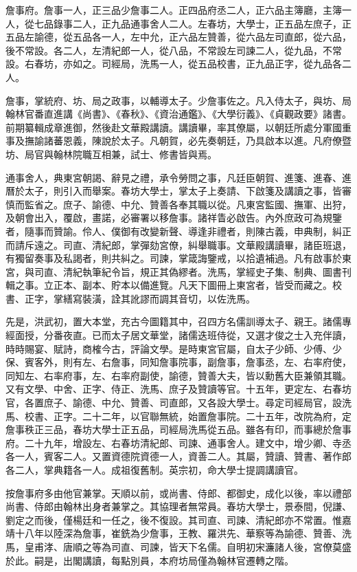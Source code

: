 詹事府。詹事一人，正三品少詹事二人。正四品府丞二人，正六品主簿廳，主簿一人，從七品錄事二人，正九品通事舍人二人。左春坊，大學士，正五品左庶子，正五品左諭德，從五品各一人，左中允，正六品左贊善，從六品左司直郎，從六品，後不常設。各二人，左清紀郎一人，從八品，不常設左司諫二人，從九品，不常設。右春坊，亦如之。司經局，洗馬一人，從五品校書，正九品正字，從九品各二人。

詹事，掌統府、坊、局之政事，以輔導太子。少詹事佐之。凡入侍太子，與坊、局翰林官番直進講《尚書》、《春秋》、《資治通鑑》、《大學衍義》、《貞觀政要》諸書。前期纂輯成章進御，然後赴文華殿講讀。講讀畢，率其僚屬，以朝廷所處分軍國重事及撫諭諸蕃恩義，陳說於太子。凡朝賀，必先奏朝廷，乃具啟本以進。凡府僚暨坊、局官與翰林院職互相兼，試士、修書皆與焉。

通事舍人，典東宮朝謁、辭見之禮，承令勞問之事，凡廷臣朝賀、進箋、進春、進曆於太子，則引入而舉案。春坊大學士，掌太子上奏請、下啟箋及講讀之事，皆審慎而監省之。庶子、諭德、中允、贊善各奉其職以從。凡東宮監國、撫軍、出狩，及朝會出入，覆啟，畫諾，必審署以移詹事。諸祥眚必啟告。內外庶政可為規鑒者，隨事而贊諭。伶人、僕御有改變新聲、導逢非禮者，則陳古義，申典制，糾正而請斥遠之。司直、清紀郎，掌彈劾宮僚，糾舉職事。文華殿講讀畢，諸臣班退，有獨留奏事及私謁者，則共糾之。司諫，掌箴誨鑒戒，以拾遺補過。凡有啟事於東宮，與司直、清紀執筆紀令旨，規正其偽繆者。洗馬，掌經史子集、制典、圖書刊輯之事。立正本、副本、貯本以備進覽。凡天下圖冊上東宮者，皆受而藏之。校書、正字，掌繕寫裝潢，詮其訛謬而調其音切，以佐洗馬。

先是，洪武初，置大本堂，充古今圖籍其中，召四方名儒訓導太子、親王。諸儒專經面授，分番夜直。已而太子居文華堂，諸儒迭班侍從，又選才俊之士入充伴讀，時時賜宴、賦詩，商榷今古，評論文學。是時東宮官屬，自太子少師、少傅、少保、賓客外，則有左、右詹事，同知詹事院事，副詹事，詹事丞，左、右率府使，同知左、右率府事，左、右率府副使，諭德，贊善大夫，皆以勳舊大臣兼領其職。又有文學、中舍、正字、侍正、洗馬、庶子及贊讀等官。十五年，更定左、右春坊官，各置庶子、諭德、中允、贊善、司直郎，又各設大學士。尋定司經局官，設洗馬、校書、正字。二十二年，以官聯無統，始置詹事院。二十五年，改院為府，定詹事秩正三品，春坊大學士正五品，司經局洗馬從五品。雖各有印，而事總於詹事府。二十九年，增設左、右春坊清紀郎、司諫、通事舍人。建文中，增少卿、寺丞各一人，賓客二人。又置資德院資德一人，資善二人。其屬，贊讀、贊書、著作郎各二人，掌典籍各一人。成祖復舊制。英宗初，命大學士提調講讀官。

按詹事府多由他官兼掌。天順以前，或尚書、侍郎、都御史，成化以後，率以禮部尚書、侍郎由翰林出身者兼掌之。其協理者無常員。春坊大學士，景泰間，倪謙、劉定之而後，僅楊廷和一任之，後不復設。其司直、司諫、清紀郎亦不常置。惟嘉靖十八年以陸深為詹事，崔銑為少詹事，王教、羅洪先、華察等為諭德、贊善、洗馬，皇甫涍、唐順之等為司直、司諫，皆天下名儒。自明初宋濂諸人後，宮僚莫盛於此。嗣是，出閣講讀，每點別員，本府坊局僅為翰林官遷轉之階。

